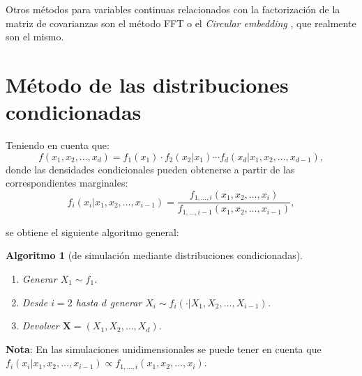 \documentclass[
  10pt,
]{book}
\renewcommand{\mathbf}[1]{\symbf{#1}}
\theoremstyle{break}
\newtheorem{conjecture}{Algoritmo}[chapter]
\theoremstyle{nonumberplain}
\begin{document}
Otros métodos para variables continuas relacionados con la factorización de la matriz de covarianzas son el método FFT \citep[transformada rápida de Fourier, e.g.][]{davies1987} o el \emph{Circular embedding} \citep{dietrich1997}, que realmente son el mismo.

\hypertarget{distrcond}{%
\section{Método de las distribuciones condicionadas}\label{distrcond}}

Teniendo en cuenta que:
\[f\left( x_1,x_2,\ldots,x_d\right) =f_1\left( x_1\right)  \cdot
f_2\left( x_2|x_1\right)  \cdots f_d\left( x_d|x_1,x_2,\ldots,x_{d-1}\right),\]
donde las densidades condicionales pueden obtenerse a partir de las
correspondientes marginales:
\[f_i\left( x_i|x_1,x_2,\ldots,x_{i-1}\right) = \frac{f_{1,\ldots
,i}\left( x_1,x_2,\ldots,x_i\right)  }{f_{1,\ldots,i-1}\left(
x_1,x_2,\ldots,x_{i-1}\right)},\]

se obtiene el siguiente algoritmo general:

\begin{conjecture}[de simulación mediante distribuciones condicionadas]
\protect\hypertarget{cnj:mult-distrcond}{}\label{cnj:mult-distrcond}\leavevmode

\begin{enumerate}
\def\labelenumi{\arabic{enumi}.}
\item
  Generar \(X_1 \sim f_1\).
\item
  Desde \(i=2\) hasta \(d\) generar
  \(X_i \sim f_i\left( \cdot|X_1,X_2,\ldots,X_{i-1}\right)\).
\item
  Devolver \(\mathbf{X} = \left( X_1,X_2,\ldots,X_d\right)\).
\end{enumerate}

\end{conjecture}

\textbf{Nota}: En las simulaciones unidimensionales se puede tener en cuenta que
\(f_i\left( x_i|x_1,x_2,\ldots,x_{i-1}\right) \propto f_{1,\ldots,i}\left( x_1,x_2,\ldots,x_i\right)\).
\end{document}
